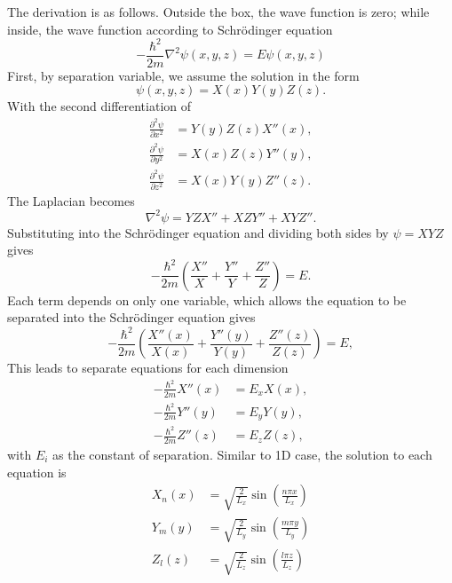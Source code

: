 \documentclass[../../../main.tex]{subfiles}
\begin{document}
The derivation is as follows.
Outside the box, the wave function is zero; while inside, the wave function according to Schrödinger equation
\begin{equation*}
  -\frac{\hbar^2}{2m} \nabla^2 \psi(x,y,z) = E \psi(x,y,z)
\end{equation*}
First, by separation variable, we assume the solution in the form
\begin{equation*}
  \psi(x,y,z) = X(x) Y(y) Z(z).
\end{equation*}
With the second differentiation of
\begin{align*}
  \frac{\partial^2 \psi}{\partial x^2} & = Y(y) Z(z) X''(x), \\
  \frac{\partial^2 \psi}{\partial y^2} & = X(x) Z(z) Y''(y), \\
  \frac{\partial^2 \psi}{\partial z^2} & = X(x) Y(y) Z''(z).
\end{align*}
The Laplacian becomes
\begin{equation*}
  \nabla^2 \psi = Y Z X'' + X Z Y'' + X Y Z''.
\end{equation*}
Substituting into the Schrödinger equation and dividing both sides by \(\psi = X Y Z\) gives
\begin{equation*}
  -\frac{\hbar^2}{2m} \left( \frac{X''}{X} + \frac{Y''}{Y} + \frac{Z''}{Z} \right) = E.
\end{equation*}
Each term depends on only one variable, which allows the equation to be separated into the Schrödinger equation gives
\begin{equation*}
  -\frac{\hbar^2}{2m} \left( \frac{X''(x)}{X(x)} + \frac{Y''(y)}{Y(y)} + \frac{Z''(z)}{Z(z)} \right) = E,
\end{equation*}
This leads to separate equations for each dimension
\begin{align*}
  -\frac{\hbar^2}{2m} X''(x) & = E_x X(x), \\
  -\frac{\hbar^2}{2m} Y''(y) & = E_y Y(y), \\
  -\frac{\hbar^2}{2m} Z''(z) & = E_z Z(z),
\end{align*}
with $E_i$ as the constant of separation.
Similar to 1D case, the solution to each equation is
\begin{align*}
  X_n(x) & = \sqrt{\frac{2}{L_x}} \sin\left(\frac{n \pi x}{L_x}\right) \\
  Y_m(y) & = \sqrt{\frac{2}{L_y}} \sin\left(\frac{m \pi y}{L_y}\right) \\
  Z_l(z) & = \sqrt{\frac{2}{L_z}} \sin\left(\frac{l \pi z}{L_z}\right)
\end{align*}
\end{document}
